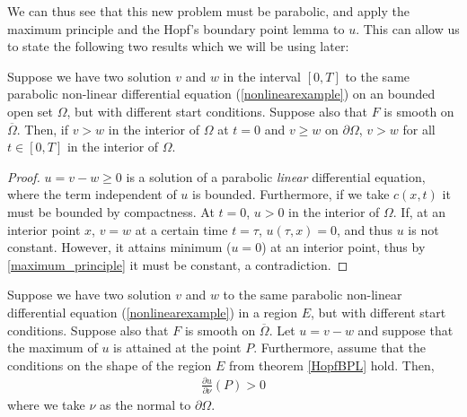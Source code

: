 We can thus see that this new problem must be parabolic, and apply the maximum principle and the Hopf's boundary point lemma to $u$. This can allow us to state the following two results which we will be using later:

\begin{proposition}
	\label{firstapplication}
	Suppose we have two solution $v$ and $w$ in the interval $[0, T]$ to the same parabolic non-linear differential equation (\ref{nonlinearexample}) on an bounded open set $\Omega$, but with different start conditions. Suppose also that $F$ is smooth on  $\overline{\Omega}$. Then, if $v>w$ in the interior of $\Omega$ at $t=0$ and $v\geq w$ on $\partial\Omega$,  $v>w$ for all $t\in[0, T]$ in the interior of $\Omega$.
\end{proposition}

\begin{proof}
	$u=v-w\geq 0$ is a solution of a parabolic \textit{linear} differential equation, where the term independent of $u$ is bounded. Furthermore, if we take $c(x, t)$ it must be bounded by compactness. At $t=0$, $u>0$ in the interior of $\Omega$. If, at an interior point $x$, $v=w$ at a certain time $t=\tau$, $u(\tau, x)=0$, and thus $u$ is not constant. However, it attains minimum ($u=0$) at an interior point, thus by \ref{maximum_principle} it must be constant, a contradiction. 
\end{proof}

\begin{proposition}
	\label{secondapplication}
	Suppose we have two solution $v$ and $w$ to the same parabolic non-linear differential equation (\ref{nonlinearexample}) in a region $E$, but with different start conditions. Suppose also that $F$ is smooth on  $\overline{\Omega}$. Let $u=v-w$ and suppose that the maximum of $u$ is attained at the point $P$. Furthermore, assume that the conditions on the shape of the region $E$ from theorem \ref{HopfBPL} hold. Then, 
	\begin{align*}
		\frac{\partial u}{\partial \nu}(P) >0
	\end{align*}
	where we take $\nu$ as the normal to $\partial\Omega$.
\end{proposition}

